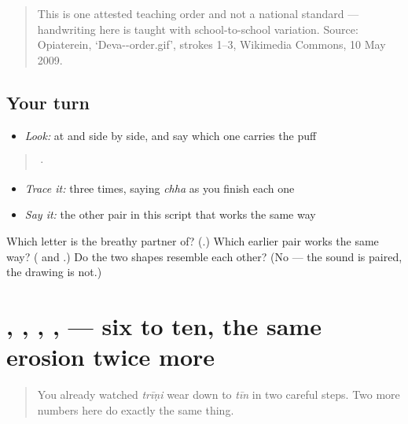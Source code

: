 \begin{quote}
This is one attested teaching order and not a national standard — handwriting here is taught with school-to-school variation. Source: Opiaterein, ‘Deva--order.gif’, strokes 1–3, Wikimedia Commons, 10 May 2009.
\end{quote}

\subsection*{Your turn}
\begin{itemize}
\raggedright
  \item \emph{Look:} at  and  side by side, and say which one carries the puff
\end{itemize}

\begin{quote}
  ·  
\end{quote}

\begin{itemize}
\raggedright
  \item \emph{Trace it:}  three times, saying \emph{chha} as you finish each one
  \item \emph{Say it:} the other pair in this script that works the same way
\end{itemize}

\begin{tcolorbox}[breakable,colback=teal!4,colframe=teal!35!black,title={Before you move on}]
Which letter is \textbf{} the breathy partner of? (\textbf{}.) Which earlier pair works the same way? (\textbf{} and \textbf{}.) Do the two shapes resemble each other? (No — the sound is paired, the drawing is not.)
\end{tcolorbox}
\section[\texorpdfstring{\hi{छह} \hi{सात} \hi{आठ} \hi{नौ} \hi{दस} (chhah sāt āṭh nau das)}{छह सात आठ नौ दस (chhah sāt āṭh nau das)}]{, , , ,  — six to ten, the same erosion twice more}

\label{lesson:HI-C21-numbers-6-10}



\begin{quote}
You already watched \emph{trīṇi} wear down to \emph{tīn} in two careful steps. Two more numbers here do exactly the same thing.
\end{quote}

